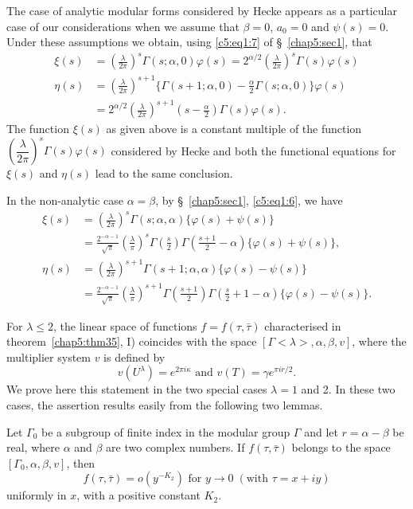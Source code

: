 The case of analytic modular forms considered by Hecke appears as a
\pageoriginale particular case of our considerations when we assume
that $\beta=0$, $a_0=0$ and $\psi(s)=0$. Under these assumptions we
obtain, using \eqref{c5:eq1:7} of \S~\ref{chap5:sec1}, that 
\begin{align*}
\xi(s) & = (\frac{\lambda}{2\pi})^s \Gamma(s;\alpha,0) \varphi(s) =
2^{\alpha/2} (\frac{\lambda}{2\pi})^s \Gamma (s) \varphi(s)\\
\eta(s) &= (\frac{\lambda}{2\pi})^{s+1} \{\Gamma(s+1;\alpha,0)
-\frac{\alpha}{2} \Gamma(s;\alpha,0)\} \varphi(s)\\
& = 2^{\alpha/2} (\frac{\lambda}{2\pi})^{s+1} (s-\frac{\alpha}{2})
\Gamma(s) \varphi(s).
\end{align*}
The function $\xi(s)$ as given above is a constant multiple of the
function $(\dfrac{\lambda}{2\pi})^s\Gamma(s)\varphi(s)$ considered by
Hecke and both the functional equations for $\xi(s)$ and $\eta(s)$
lead to the same conclusion. 

In the non-analytic case $\alpha=\beta$, by \S~\ref{chap5:sec1}, \eqref{c5:eq1:6}, we have 
\begin{align*}
\xi(s) & = (\frac{\lambda}{2\pi})^s \Gamma(s;\alpha,\alpha)
\{\varphi(s)+\psi(s)\}\\
& = \frac{2^{-\alpha-1}}{\surd\pi} (\frac{\lambda}{\pi})^s
\Gamma(\frac{s}{2}) \Gamma(\frac{s+1}{2}-\alpha) \{\varphi(s)+
\psi(s)\}, \\
\eta(s) & = (\frac{\lambda}{2\pi})^{s+1} \Gamma(s+1;\alpha,\alpha)
\{\varphi(s) - \psi(s)\} \\
& = \frac{2^{-\alpha-1}}{\surd \pi} (\frac{\lambda}{\pi})^{s+1}
\Gamma(\frac{s+1}{2}) \Gamma(\frac{s}{2}+1-\alpha) \{\varphi(s) - \psi
(s)\}. 
\end{align*}

For $\lambda \leq 2$, the linear space of functions
$f=f(\tau,\bar{\tau})$ characterised in theorem~\ref{chap5:thm35}, 
I) coincides with the space $[\Gamma<\lambda>, \alpha,\beta,v]$, 
where the multiplier system $v$ is defined by 
$$
v(U^{\lambda}) = e^{2\pi i\kappa} \text{ and } v(T) = \gamma e^{\pi
  ir/2}. 
$$
We prove here this statement in the two special cases $\lambda=1$ and
2. In these two cases, the assertion results easily from the following
two lemmas.

\begin{lem}\label{chap5:lem10}
Let $\Gamma_0$ \pageoriginale be a subgroup of finite index in the
modular group $\Gamma$ and let $r=\alpha-\beta$ be real, where
$\alpha$ and $\beta$ are two complex numbers. If $f(\tau,\bar{\tau})$
belongs to the space $[\Gamma_0, \alpha,\beta, v]$, then
$$
f(\tau,\bar{\tau}) = o (y^{-K_2}) \text{ for } y \to 0 \;  (\text{with }
\tau=x+iy) 
$$ 
uniformly in $x$, with a positive constant $K_2$. 
\end{lem}

